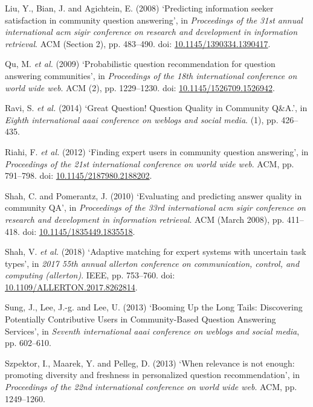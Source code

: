 \documentclass[12pt,preprint, authoryear]{article}
\numberwithin{equation}{section}
\numberwithin{figure}{section}
\numberwithin{table}{section}
\begin{document}
\hypertarget{ref-Liu2008}{}
Liu, Y., Bian, J. and Agichtein, E. (2008) `Predicting information
seeker satisfaction in community question answering', in
\emph{Proceedings of the 31st annual international acm sigir conference
on research and development in information retrieval}. ACM (Section 2),
pp. 483--490. doi:
\href{https://doi.org/10.1145/1390334.1390417}{10.1145/1390334.1390417}.

\hypertarget{ref-Qu2009}{}
Qu, M. \emph{et al.} (2009) `Probabilistic question recommendation for
question answering communities', in \emph{Proceedings of the 18th
international conference on world wide web}. ACM (2), pp. 1229--1230.
doi:
\href{https://doi.org/10.1145/1526709.1526942}{10.1145/1526709.1526942}.

\hypertarget{ref-Ravi2014}{}
Ravi, S. \emph{et al.} (2014) `Great Question! Question Quality in
Community Q\&A.', in \emph{Eighth international aaai conference on
weblogs and social media}. (1), pp. 426--435.

\hypertarget{ref-Riahi2012}{}
Riahi, F. \emph{et al.} (2012) `Finding expert users in community
question answering', in \emph{Proceedings of the 21st international
conference on world wide web}. ACM, pp. 791--798. doi:
\href{https://doi.org/10.1145/2187980.2188202}{10.1145/2187980.2188202}.

\hypertarget{ref-Shah2010}{}
Shah, C. and Pomerantz, J. (2010) `Evaluating and predicting answer
quality in community QA', in \emph{Proceedings of the 33rd international
acm sigir conference on research and development in information
retrieval}. ACM (March 2008), pp. 411--418. doi:
\href{https://doi.org/10.1145/1835449.1835518}{10.1145/1835449.1835518}.

\hypertarget{ref-Shah2018}{}
Shah, V. \emph{et al.} (2018) `Adaptive matching for expert systems with
uncertain task types', in \emph{2017 55th annual allerton conference on
communication, control, and computing (allerton)}. IEEE, pp. 753--760.
doi:
\href{https://doi.org/10.1109/ALLERTON.2017.8262814}{10.1109/ALLERTON.2017.8262814}.

\hypertarget{ref-Sung2013}{}
Sung, J., Lee, J.-g. and Lee, U. (2013) `Booming Up the Long Tails:
Discovering Potentially Contributive Users in Community-Based Question
Answering Services', in \emph{Seventh international aaai conference on
weblogs and social media}, pp. 602--610.

\hypertarget{ref-Szpektor2013}{}
Szpektor, I., Maarek, Y. and Pelleg, D. (2013) `When relevance is not
enough: promoting diversity and freshness in personalized question
recommendation', in \emph{Proceedings of the 22nd international
conference on world wide web}. ACM, pp. 1249--1260.
\end{document}
